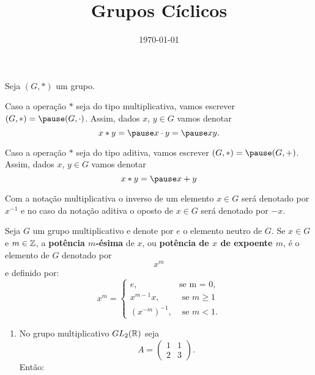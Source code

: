 \documentclass{beamer}
\title{Grupos Cíclicos}
\author[\autor]{\autor}
\institute[\instituto]{\instituto}
\date{\today}
\begin{document}
    \begin{frame}
        \maketitle
    \end{frame}


    \begin{frame}
        Seja $(G, *)$ um grupo. \pause

        Caso a operação $*$ seja do tipo multiplicativa, vamos escrever $(G, *) = \pause (G, \cdot)$. \pause Assim, dados $x$, $y \in G$ vamos denotar\pause
        \[
            x * y = \pause x \cdot y = \pause xy.
        \]

        Caso a operação $*$ seja do tipo aditiva, vamos escrever $(G, *) = \pause (G, +)$. \pause Assim, dados $x$, $y \in G$ vamos denotar\pause
        \[
            x * y = \pause x + y
        \]

        Com a notação multiplicativa \pause o inverso de um elemento $x \in G$ \pause será denotado por $x^{-1}$ \pause e no caso da notação aditiva \pause o oposto de $x \in G$ \pause será denotado por $-x$.
    \end{frame}

    \begin{frame}
        Seja $G$ um grupo multiplicativo e denote por $e$ o elemento neutro de $G$. Se $x \in G$ e $m \in \mathbb{Z}$, a \textbf{potência $m$-ésima} de $x$, ou \textbf{potência de $x$ de expoente $m$}, é o elemento de $G$ denotado por
        \[
            x^m
        \]
        e definido por:
        \[
            x^m = \begin{cases}
                    e, & \mbox{se m = 0},\\
                    x^{m-1}x, & \mbox{ se } m \ge 1\\
                    (x^{-m})^{-1}, & \mbox{ se } m < 1. 
                   \end{cases}
        \]
        
    \end{frame}

    \begin{frame}
        \begin{exemplos}
            \begin{enumerate}[label={\arabic*})]
                \item No grupo multiplicativo $GL_2(\mathbb{R})$ seja
                \[
                    A = \begin{pmatrix}
                        1 & 1\\2 & 3
                    \end{pmatrix}.
                \]
                Então:
                \seti
            \end{enumerate}
        \end{exemplos}
    \end{frame}
    
\end{document}
